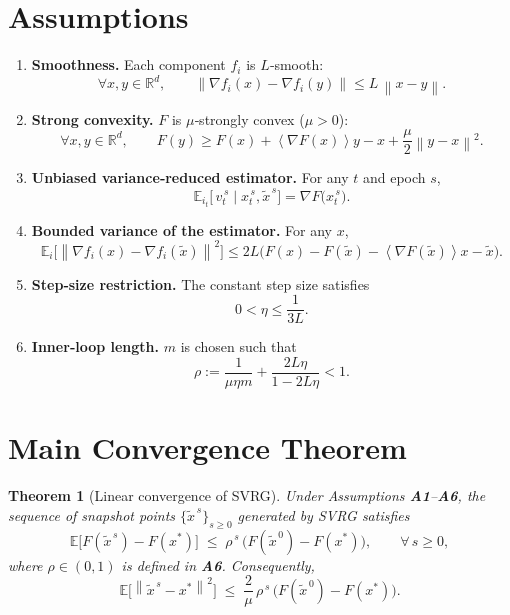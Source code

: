 \documentclass{article}
\newtheorem{theorem}{Theorem}
\newcommand{\E}{\mathbb{E}}
\newcommand{\R}{\mathbb{R}}
\newcommand{\norm}[1]{\left\|#1\right\|}
\newcommand{\inner}[1]{\left\langle #1 \right\rangle}
\begin{document}
\section*{Assumptions}
\begin{enumerate}[label=\textbf{A\arabic*:}, leftmargin=*]
\item \textbf{Smoothness.} Each component $f_i$ is $L$‑smooth:
\[
\forall x,y\in\R^{d},\qquad 
\norm{\nabla f_i(x)-\nabla f_i(y)}\le L\,\norm{x-y}.
\tag{A1}
\]
\item \textbf{Strong convexity.} $F$ is $\mu$‑strongly convex ($\mu>0$):
\[
\forall x,y\in\R^{d},\qquad 
F(y)\ge F(x)+\inner{\nabla F(x)}{y-x}+\frac{\mu}{2}\norm{y-x}^{2}.
\tag{A2}
\]
\item \textbf{Unbiased variance‑reduced estimator.} For any $t$ and epoch $s$,
\[
\E_{i_t}\!\bigl[\,v_{t}^{\,s}\mid x_{t}^{\,s},\tilde{x}^{\,s}\bigr]
      =\nabla F\!\bigl(x_{t}^{\,s}\bigr).
\tag{A3}
\]
\item \textbf{Bounded variance of the estimator.} For any $x$,
\[
\E_{i}\!\bigl[\norm{\nabla f_i(x)-\nabla f_i(\tilde{x})}^{2}\bigr]
      \le 2L\bigl(F(x)-F(\tilde{x})- \inner{\nabla F(\tilde{x})}{x-\tilde{x}}\bigr).
\tag{A4}
\]
\item \textbf{Step‑size restriction.} The constant step size satisfies
\[
0<\eta\le\frac{1}{3L}.
\tag{A5}
\]
\item \textbf{Inner‑loop length.} $m$ is chosen such that
\[
\rho:=\frac{1}{\mu\eta m}+\frac{2L\eta}{1-2L\eta}<1.
\tag{A6}
\]
\end{enumerate}

\section*{Main Convergence Theorem}
\begin{theorem}[Linear convergence of SVRG]\label{thm:linear}
Under Assumptions \textbf{A1}–\textbf{A6}, the sequence of snapshot points $\{\tilde{x}^{\,s}\}_{s\ge0}$ generated by SVRG satisfies
\[
\E\!\bigl[F(\tilde{x}^{\,s})-F(x^{*})\bigr]\;\le\;\rho^{\,s}\,
        \bigl(F(\tilde{x}^{\,0})-F(x^{*})\bigr),
\qquad\forall\,s\ge0,
\tag{4}
\]
where $\rho\in(0,1)$ is defined in \textbf{A6}. Consequently,
\[
\E\!\bigl[\norm{\tilde{x}^{\,s}-x^{*}}^{2}\bigr]\;\le\;\frac{2}{\mu}\,\rho^{\,s}\,
        \bigl(F(\tilde{x}^{\,0})-F(x^{*})\bigr).
\tag{5}
\]
\end{theorem}
\end{document}
